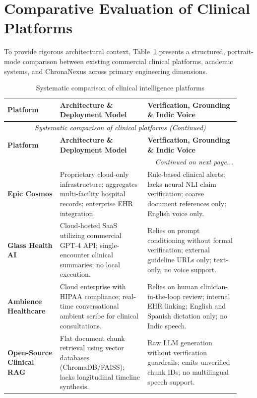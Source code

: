 \section{Comparative Evaluation of Clinical Platforms}
\label{sec:lit_comparative_matrix}

To provide rigorous architectural context, Table~\ref{tab:2_1_comparative_systems} presents a structured, portrait-mode comparison between existing commercial clinical platforms, academic systems, and ChronaNexus across primary engineering dimensions.

\small
\begin{longtable}{@{}p{0.21\linewidth} p{0.35\linewidth} p{0.37\linewidth}@{}}
\caption{Systematic comparison of clinical intelligence platforms}\label{tab:2_1_comparative_systems} \\
\toprule
\textbf{Platform} & \textbf{Architecture \& Deployment Model} & \textbf{Verification, Grounding \& Indic Voice} \\
\midrule
\endfirsthead
\toprule
\multicolumn{3}{c}{\small\textit{Systematic comparison of clinical platforms (Continued)}} \\[4pt]
\midrule
\textbf{Platform} & \textbf{Architecture \& Deployment Model} & \textbf{Verification, Grounding \& Indic Voice} \\
\midrule
\endhead
\midrule
\multicolumn{3}{r}{\footnotesize\textit{Continued on next page...}} \\
\bottomrule
\endfoot
\bottomrule
\endlastfoot
\textbf{Epic Cosmos} & Proprietary cloud-only infrastructure; aggregates multi-facility hospital records; enterprise EHR integration. & Rule-based clinical alerts; lacks neural NLI claim verification; coarse document references only; English voice only. \\
\midrule
\textbf{Glass Health AI} & Cloud-hosted SaaS utilizing commercial GPT-4 API; single-encounter clinical summaries; no local execution. & Relies on prompt conditioning without formal verification; external guideline URLs only; text-only, no voice support. \\
\midrule
\textbf{Ambience Healthcare} & Cloud enterprise with HIPAA compliance; real-time conversational ambient scribe for clinical consultations. & Relies on human clinician-in-the-loop review; internal EHR linking; English and Spanish dictation only; no Indic speech. \\
\midrule
\textbf{Open-Source Clinical RAG} & Flat document chunk retrieval using vector databases (ChromaDB/FAISS); lacks longitudinal timeline synthesis. & Raw LLM generation without verification guardrails; emits unverified chunk IDs; no multilingual speech support. \\

\end{longtable}
